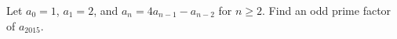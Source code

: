 Let $a_0=1$, $a_1=2$, and $a_n=4a_{n-1}-a_{n-2}$ for $n\geq 2$. Find an odd prime factor of $a_{2015}$.
